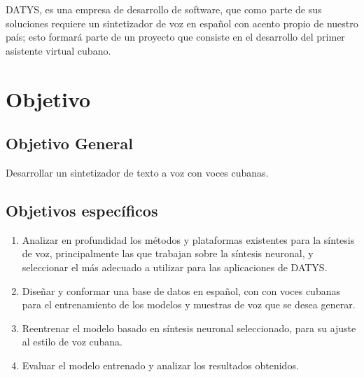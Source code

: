 DATYS, es una empresa de desarrollo de software, que como parte de sus soluciones requiere un sintetizador de voz en español con acento propio de nuestro país; esto formará parte de un proyecto que consiste en el desarrollo del primer asistente virtual cubano. 

\section*{Objetivo}

\subsection*{Objetivo General}

Desarrollar un sintetizador de texto a voz con voces cubanas.

\subsection*{Objetivos específicos}
\begin{enumerate}
	\item Analizar en profundidad los métodos y plataformas existentes para la síntesis de voz, principalmente las que trabajan sobre la síntesis neuronal, y seleccionar el más adecuado a utilizar para las aplicaciones de DATYS.
	\item Diseñar y conformar una base de datos en español, con con voces cubanas para el entrenamiento de los modelos y muestras de voz que se desea generar.
	\item Reentrenar el modelo basado en síntesis neuronal seleccionado, para su ajuste al estilo de voz cubana.
	\item Evaluar el modelo entrenado y analizar los resultados obtenidos.
\end{enumerate}
